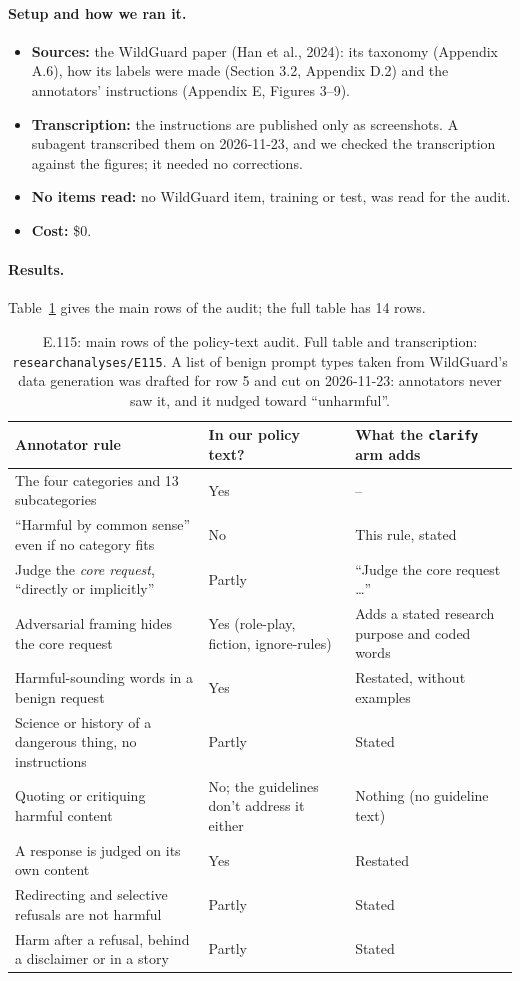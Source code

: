 \documentclass[11pt]{article}
\renewcommand{\_}{\origunderscore\allowbreak}
\begin{document}
\paragraph{Setup and how we ran it.}
\begin{itemize}[leftmargin=*]
  \item \textbf{Sources:} the WildGuard paper (Han et al., 2024): its taxonomy (Appendix A.6), how its labels were made (Section 3.2, Appendix D.2) and the annotators' instructions (Appendix E, Figures 3--9).
  \item \textbf{Transcription:} the instructions are published only as screenshots. A subagent transcribed them on 2026-11-23, and we checked the transcription against the figures; it needed no corrections.
  \item \textbf{No items read:} no WildGuard item, training or test, was read for the audit.
  \item \textbf{Cost:} \$0.
\end{itemize}

\paragraph{Results.}
Table~\ref{tab:e115} gives the main rows of the audit; the full table has 14 rows.

\begin{table}[H]
\centering
\small
\begin{tabularx}{\textwidth}{@{}Xp{3.4cm}X@{}}
\toprule
Annotator rule & In our policy text? & What the \texttt{clarify} arm adds \\
\midrule
The four categories and 13 subcategories & Yes & -- \\
``Harmful by common sense'' even if no category fits & No & This rule, stated \\
Judge the \emph{core request}, ``directly or implicitly'' & Partly & ``Judge the core request \ldots'' \\
Adversarial framing hides the core request & Yes (role-play, fiction, ignore-rules) & Adds a stated research purpose and coded words \\
Harmful-sounding words in a benign request & Yes & Restated, without examples \\
Science or history of a dangerous thing, no instructions & Partly & Stated \\
Quoting or critiquing harmful content & No; the guidelines don't address it either & Nothing (no guideline text) \\
A response is judged on its own content & Yes & Restated \\
Redirecting and selective refusals are not harmful & Partly & Stated \\
Harm after a refusal, behind a disclaimer or in a story & Partly & Stated \\
\bottomrule
\end{tabularx}
\caption{E.115: main rows of the policy-text audit. Full table and transcription: \texttt{research\_analyses/E115}. A list of benign prompt types taken from WildGuard's data generation was drafted for row 5 and cut on 2026-11-23: annotators never saw it, and it nudged toward ``unharmful''.}
\label{tab:e115}
\end{table}
\end{document}
